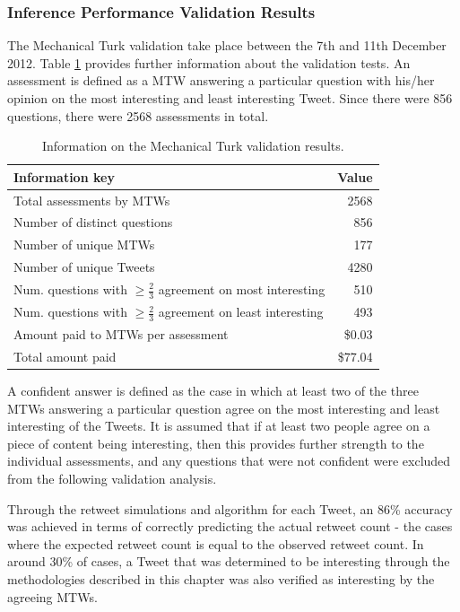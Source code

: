 \subsubsection{Inference Performance Validation Results}
\label{section:initial_inference_results}
The Mechanical Turk validation take place between the 7th and 11th December 2012. Table \ref{table:mtk_data_1} provides further information about the validation tests. An assessment is defined as a MTW answering a particular question with his/her opinion on the most interesting and least interesting Tweet. Since there were 856 questions, there were 2568 assessments in total.

\begin{table}[h]\footnotesize
\begin{center}
\begin{tabular}{ l || r }
     Information key & Value\\
     \hline
     \hline
	 Total assessments by MTWs & 2568\\
	 Number of distinct questions & 856\\
	 Number of unique MTWs & 177\\
	 Number of unique Tweets & 4280\\
	 \hline
	 Num. questions with $\geq \frac{2}{3}$ agreement on most interesting & 510\\
	 Num. questions with $\geq \frac{2}{3}$ agreement on least interesting & 493\\
	 \hline
	 Amount paid to MTWs per assessment & \$0.03\\
	 Total amount paid & \$77.04\\
     \hline
\end{tabular}
\end{center}
\caption{Information on the Mechanical Turk validation results.}
\label{table:mtk_data_1}
\end{table}

A confident answer is defined as the case in which at least two of the three MTWs answering a particular question agree on the most interesting and least interesting of the Tweets. It is assumed that if at least two people agree on a piece of content being interesting, then this provides further strength to the individual assessments, and any questions that were not confident were excluded from the following validation analysis.

Through the retweet simulations and algorithm for each Tweet, an 86\% accuracy was achieved in terms of correctly predicting the actual retweet count - the cases where the expected retweet count is equal to the observed retweet count. In around 30\% of cases, a Tweet that was determined to be interesting through the methodologies described in this chapter was also verified as interesting by the agreeing MTWs.

